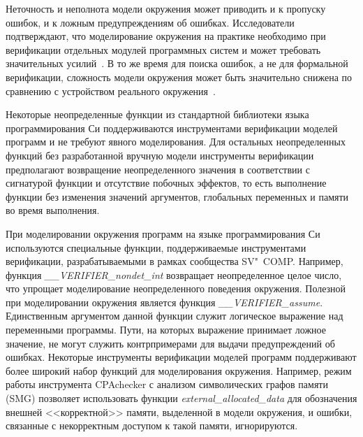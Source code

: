 Неточность и неполнота модели окружения может приводить и к пропуску ошибок, и к ложным предупреждениям об ошибках.
Исследователи подтверждают, что моделирование окружения на практике необходимо при верификации отдельных модулей программных систем и может требовать значительных усилий~\cite{subsystems:Trudy, ZakharovEnv2015, ModelingLargeSystems, neville2016a, FlashDriver, ConcurBugsRakamaric, Ivancic:2015:SSS}.
В то же время для поиска ошибок, а не для формальной верификации, сложность модели окружения может быть значительно снижена по сравнению с устройством реального окружения~\cite{ZakharovEnv2015}.

Некоторые неопределенные функции из стандартной библиотеки языка программирования Си поддерживаются инструментами верификации моделей программ и не требуют явного моделирования.
Для остальных неопределенных функций без разработанной вручную модели инструменты верификации предполагают возвращение неопределенного значения в соответствии с сигнатурой функции и отсутствие побочных эффектов, то есть выполнение функции без изменения значений аргументов, глобальных переменных и памяти во время выполнения.

При моделировании окружения программ на языке программирования Си используются специальные функции, поддерживаемые инструментами верификации, разрабатываемыми в рамках сообщества SV"~COMP.
Например, функция \textit{\_\_VERIFIER\_nondet\_int} возвращает неопределенное целое число, что упрощает моделирование неопределенного поведения окружения.
Полезной при моделировании окружения является функция \textit{\_\_VERIFIER\_assume}.
Единственным аргументом данной функции служит логическое выражение над переменными программы.
Пути, на которых выражение принимает ложное значение, не могут служить контрпримерами для выдачи предупреждений об ошибках.
Некоторые инструменты верификации моделей программ поддерживают более широкий набор функций для моделирования окружения.
Например, режим работы инструмента CPAchecker с анализом символических графов памяти (SMG) позволяет использовать функции \textit{external\_allocated\_data} для обозначения внешней <<корректной>> памяти, выделенной в модели окружения, и ошибки, связанные с некорректным доступом к такой памяти, игнорируются.

